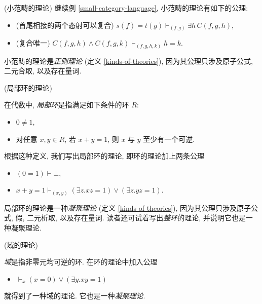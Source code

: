 %    

\begin{example}
	[label={small-category-theory}]
	{(小范畴的理论)}
	继续例 \ref{small-category-language}, 小范畴的理论有如下的公理:
	\begin{itemize}
		\item (首尾相接的两个态射可以复合) $s(f)=t(g)\vdash_{(f,g)}\exists h\, C(f,g,h)$,
		\item (复合唯一)
		$C(f,g,h)\land C(f,g,k) \vdash_{(f,g,h,k)} h=k$.
	\end{itemize}
	小范畴的理论是\emph{正则理论} (定义 \ref{kinds-of-theories}), 因为其公理只涉及原子公式, 二元合取, 以及存在量词.
\end{example}

\begin{example}
	{(局部环的理论)}
	
	在代数中, \emph{局部环}\footnotemark{}是指满足如下条件的环 $R$:
	\begin{itemize}
		\item $0\neq 1$,
		\item 对任意 $x,y\in R$, 若 $x+y=1$, 则 $x$ 与 $y$ 至少有一个可逆.
	\end{itemize}
	根据这种定义, 我们写出局部环的理论, 即环的理论加上两条公理
	\begin{itemize}
		\item $(0=1)\vdash \bot$,
		\item $x+y=1\vdash_{(x,y)} (\exists z. xz=1)\vee (\exists z. yz=1)$.
	\end{itemize}
	局部环的理论是一种\emph{凝聚理论} (定义 \ref{kinds-of-theories}), 因为其公理只涉及原子公式, 假, 二元析取, 以及存在量词.
	读者还可试着写出\emph{整环}的理论, 并说明它也是一种凝聚理论.
\end{example}


\begin{example}
	{(域的理论)}
	
	\emph{域}是指非零元均可逆的环. 在环的理论中加入公理
	\begin{itemize}
		\item $\vdash_x (x=0) \lor (\exists y. xy=1)$
	\end{itemize}
	就得到了一种域的理论\footnotemark. 它也是一种\emph{凝聚理论}.
\end{example}

